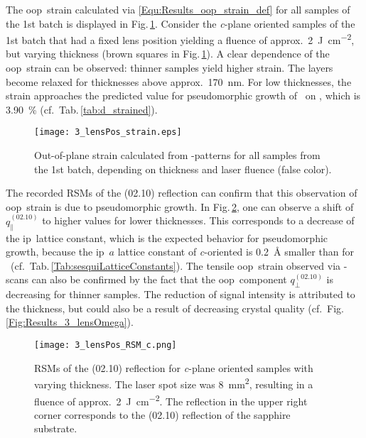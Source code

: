 The \gls{oop}\ strain calculated via \eqref{Equ:Results_oop_strain_def} for all samples of the 1st batch is displayed in Fig.\,\ref{Fig:Results_3_lensStrain}.
Consider the \textit{c}-plane oriented samples of the 1st batch that had a fixed lens position yielding a fluence of approx.\ \qty{2}{\joule\per\cm\squared}, but varying thickness (brown squares in Fig.\,\ref{Fig:Results_3_lensStrain}).
A clear dependence of the \gls{oop}\ strain can be observed: thinner samples yield higher strain.
The layers become relaxed for thicknesses above approx.\ \qty{170}{\nm}.
For low thicknesses, the strain approaches the predicted value for pseudomorphic growth of \cro\ on , which is \qty{3.90}{\percent} (cf.\ Tab.\,\ref{tab:d_strained}).
\begin{figure}
    \centering
    \texttt{[image: 3\_lensPos\_strain.eps]}
    \caption{
        Out-of-plane strain calculated from \thetaomega-patterns for all samples from the 1st batch, depending on thickness and laser fluence (false color).
    }
    \label{Fig:Results_3_lensStrain}
\end{figure}
The recorded \glspl{RSM} of the (02.10) reflection can confirm that this observation of \gls{oop}\ strain is due to pseudomorphic growth.
In Fig.\,\ref{Fig:Results_3_cRSMs}, one can observe a shift of $q_\parallel^{(02.10)}$ to higher values for lower thicknesses.
This corresponds to a decrease of the \gls{ip}\ lattice constant, which is the expected behavior for pseudomorphic growth, because the \gls{ip}\ $a$ lattice constant of \textit{c}-oriented  is \qty{0.2}{\angstrom} smaller than for \cro\ (cf.~Tab.\,\ref{Tab:sesquiLatticeConstants}).
The tensile \gls{oop}\ strain observed via \thetaomega-scans can also be confirmed by the fact that the \gls{oop}\ component $q_\perp^{(02.10)}$ is decreasing for thinner samples.
The reduction of signal intensity is attributed to the thickness, but could also be a result of decreasing crystal quality (cf.~Fig.\,\ref{Fig:Results_3_lensOmega}).
\begin{figure}
    \centering
    \texttt{[image: 3\_lensPos\_RSM\_c.png]}
    \caption{
        \glspl{RSM} of the (02.10) reflection for \textit{c}-plane oriented samples with varying thickness.
        The laser spot size was \qty{8}{\mm\squared}, resulting in a fluence of approx.\ \qty{2}{\J\per\cm\squared}.
        The reflection in the upper right corner corresponds to the (02.10) reflection of the sapphire substrate.
    }
    \label{Fig:Results_3_cRSMs}
\end{figure}
